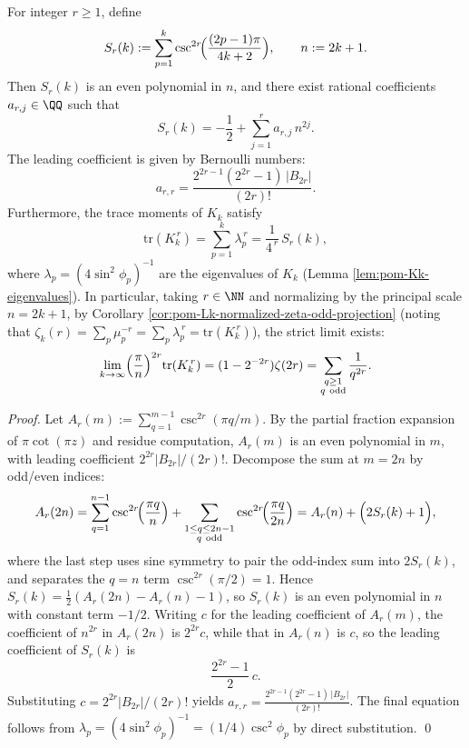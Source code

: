 \begin{proposition}\label{prop:pom-csc-moments-bernoulli}
For integer \(r\ge 1\), define
\[
S_r(k):=\sum_{p=1}^{k}\csc^{2r}\!\Bigl(\frac{(2p-1)\pi}{4k+2}\Bigr),
\qquad
n:=2k+1.
\]
Then \(S_r(k)\) is an even polynomial in \(n\), and there exist rational coefficients \(a_{r,j}\in\QQ\) such that
\[
S_r(k)=-\frac12+\sum_{j=1}^{r} a_{r,j}\,n^{2j}.
\]
The leading coefficient is given by Bernoulli numbers:
\[
a_{r,r}=\frac{2^{2r-1}(2^{2r}-1)\,|B_{2r}|}{(2r)!}.
\]
Furthermore, the trace moments of \(K_k\) satisfy
\[
\mathrm{tr}(K_k^{\,r})=\sum_{p=1}^{k}\lambda_p^{\,r}=\frac{1}{4^{\,r}}\,S_r(k),
\]
where \(\lambda_p=(4\sin^2\phi_p)^{-1}\) are the eigenvalues of \(K_k\) (Lemma \ref{lem:pom-Kk-eigenvalues}).
In particular, taking \(r\in\NN\) and normalizing by the principal scale \(n=2k+1\), by Corollary \ref{cor:pom-Lk-normalized-zeta-odd-projection} (noting that \(\zeta_k(r)=\sum_p\mu_p^{-r}=\sum_p\lambda_p^{\,r}=\mathrm{tr}(K_k^{\,r})\)), the strict limit exists:
\[
\lim_{k\to\infty}\Bigl(\frac{\pi}{n}\Bigr)^{2r}\mathrm{tr}(K_k^{\,r})
=(1-2^{-2r})\zeta(2r)
=\sum_{\substack{q\ge 1\\ q\ \mathrm{odd}}}\frac{1}{q^{2r}}.
\]
\end{proposition}
\begin{proof}
Let
\(
A_r(m):=\sum_{q=1}^{m-1}\csc^{2r}(\pi q/m)
\).
By the partial fraction expansion of \(\pi\cot(\pi z)\) and residue computation, \(A_r(m)\) is an even polynomial in \(m\), with leading coefficient \(2^{2r}|B_{2r}|/(2r)!\).
Decompose the sum at \(m=2n\) by odd/even indices:
\[
A_r(2n)=\sum_{q=1}^{n-1}\csc^{2r}\!\Bigl(\frac{\pi q}{n}\Bigr)+\sum_{\substack{1\le q\le 2n-1\\ q\ \mathrm{odd}}}\csc^{2r}\!\Bigl(\frac{\pi q}{2n}\Bigr)
=A_r(n)+\Bigl(2S_r(k)+1\Bigr),
\]
where the last step uses sine symmetry to pair the odd-index sum into \(2S_r(k)\), and separates the \(q=n\) term \(\csc^{2r}(\pi/2)=1\).
Hence
\(
S_r(k)=\frac12(A_r(2n)-A_r(n)-1)
\), so \(S_r(k)\) is an even polynomial in \(n\) with constant term \(-1/2\).
Writing \(c\) for the leading coefficient of \(A_r(m)\), the coefficient of \(n^{2r}\) in \(A_r(2n)\) is \(2^{2r}c\), while that in \(A_r(n)\) is \(c\), so the leading coefficient of \(S_r(k)\) is
\[
\frac{2^{2r}-1}{2}\,c.
\]
Substituting \(c=2^{2r}|B_{2r}|/(2r)!\) yields
\(
a_{r,r}=\frac{2^{2r-1}(2^{2r}-1)\,|B_{2r}|}{(2r)!}
\).
The final equation follows from \(\lambda_p=(4\sin^2\phi_p)^{-1}=(1/4)\csc^2\phi_p\) by direct substitution. \qed
\end{proof}

